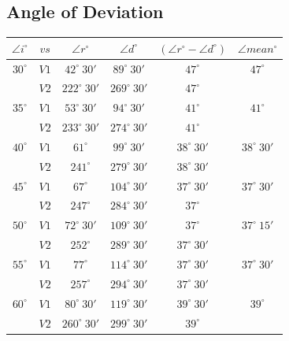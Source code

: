 \documentclass{article}
\begin{document}
\subsection{\Large Angle of Deviation}
\begin{tabular}{cccccc}
\hline $\angle i^{\circ}$ & $vs$ & $\angle r^{\circ}$ & $\angle d^{\circ}$ & $(\angle r^{\circ}-\angle d^{\circ})$ & $\angle mean^{\circ}$ \\
\hline
$30 ^{\circ}$ & $V1$ & $42 ^{\circ} \ 30'$ & $89 ^{\circ} \ 30'$ & $47 ^{\circ}$ &  $47 ^{\circ}$  \\ 

 & $V2$ & $222 ^{\circ} \ 30'$ & $269 ^{\circ} \ 30'$ & $47 ^{\circ}$ &  \\

$35 ^{\circ}$ & $V1$ & $53 ^{\circ} \ 30'$ & $94 ^{\circ} \ 30'$ & $41 ^{\circ}$ & $41 ^{\circ}$ \\

 & $V2$ & $233 ^{\circ} \ 30'$ & $274 ^{\circ} \ 30'$ & $41 ^{\circ}$ &  \\

$40 ^{\circ}$ & $V1$ & $61 ^{\circ}$ & $99 ^{\circ} \ 30'$ & $38 ^{\circ} \ 30'$ & $38 ^{\circ} \ 30'$ \\

 & $V2$ & $241 ^{\circ}$ & $279 ^{\circ} \ 30'$ & $38 ^{\circ} \ 30'$ &  \\

$45 ^{\circ}$ & $V1$ & $67 ^{\circ}$ & $104 ^{\circ} \ 30'$ & $37 ^{\circ} \ 30'$ &  $37 ^{\circ} \ 30'$\\

 & $V2$ & $247 ^{\circ}$ & $284 ^{\circ} \ 30'$ & $37 ^{\circ}$ &  \\

$50 ^{\circ}$ & $V1$ & $72 ^{\circ} \ 30'$ & $109 ^{\circ} \ 30'$ & $37 ^{\circ}$ &  $37 ^{\circ} \ 15'$\\

 & $V2$ & $252 ^{\circ}$ & $289 ^{\circ} \ 30'$ & $37 ^{\circ} \ 30'$ &  \\

$55 ^{\circ}$ & $V1$ & $77 ^{\circ}$ & $114 ^{\circ} \ 30'$ & $37 ^{\circ} \ 30'$ &  $37 ^{\circ} \ 30'$\\

 & $V2$ & $257 ^{\circ}$ & $294 ^{\circ} \ 30'$ & $37 ^{\circ} \ 30'$ &  \\

$60 ^{\circ}$ & $V1$ & $80 ^{\circ} \ 30'$ & $119 ^{\circ} \ 30'$ & $39 ^{\circ} \ 30'$ &  $39 ^{\circ}$\\

 & $V2$ & $260 ^{\circ} \ 30'$ & $299 ^{\circ} \ 30'$ & $39 ^{\circ}$ &  \\


\hline
\end{tabular}
\end{document}

